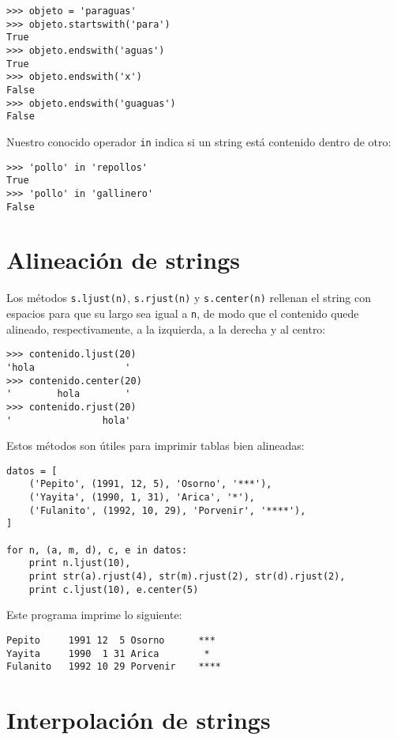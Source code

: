\begin{lstlisting}
>>> objeto = 'paraguas'
>>> objeto.startswith('para')
True
>>> objeto.endswith('aguas')
True
>>> objeto.endswith('x')
False
>>> objeto.endswith('guaguas')
False
\end{lstlisting}

Nuestro conocido operador \lstinline!in! indica si un string está
contenido dentro de otro:

\begin{lstlisting}
>>> 'pollo' in 'repollos'
True
>>> 'pollo' in 'gallinero'
False
\end{lstlisting}

\section{Alineación de strings}

Los métodos \lstinline!s.ljust(n)!, \lstinline!s.rjust(n)! y
\lstinline!s.center(n)! rellenan el string con espacios para que su
largo sea igual a \lstinline!n!, de modo que el contenido quede
alineado, respectivamente, a la izquierda, a la derecha y al centro:

\begin{lstlisting}
>>> contenido.ljust(20)
'hola                '
>>> contenido.center(20)
'        hola        '
>>> contenido.rjust(20)
'                hola'
\end{lstlisting}

Estos métodos son útiles para imprimir tablas bien alineadas:

\begin{lstlisting}
datos = [
    ('Pepito', (1991, 12, 5), 'Osorno', '***'),
    ('Yayita', (1990, 1, 31), 'Arica', '*'),
    ('Fulanito', (1992, 10, 29), 'Porvenir', '****'),
]

for n, (a, m, d), c, e in datos:
    print n.ljust(10),
    print str(a).rjust(4), str(m).rjust(2), str(d).rjust(2),
    print c.ljust(10), e.center(5)
\end{lstlisting}

Este programa imprime lo siguiente:
\begin{lstlisting}[language=testcase]
Pepito     1991 12  5 Osorno      ***
Yayita     1990  1 31 Arica        *
Fulanito   1992 10 29 Porvenir    ****
\end{lstlisting}

\section{Interpolación de strings}

